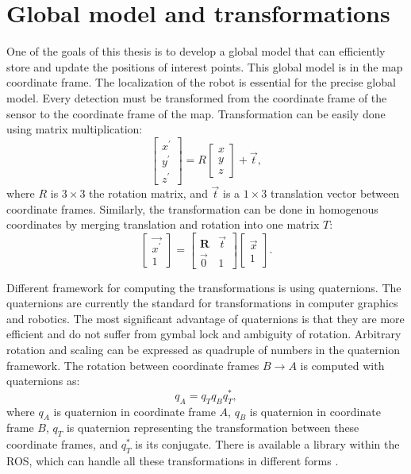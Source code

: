 \section{Global model and transformations}
One of the goals of this thesis is to develop a global model that can efficiently store and update the positions of interest points. This global model is in the map coordinate frame. The localization of the robot is essential for the precise global model. Every detection must be transformed from the coordinate frame of the sensor to the coordinate frame of the map. Transformation can be easily done using matrix multiplication:
\begin{equation}
\begin{bmatrix}
x^\prime \\
y^\prime \\
z^\prime 
\end{bmatrix}
=
R \begin{bmatrix}
x \\
y \\
z
\end{bmatrix}
+ \vec{t},
\end{equation}
where $R$ is $3\times3$ the rotation matrix, and $\vec{t}$ is a $1\times3$ translation vector between coordinate frames. Similarly, the transformation can be done in homogenous coordinates by merging translation and rotation into one matrix $T$:
\begin{equation}
\begin{bmatrix}
\vec{x^\prime} \\
1
\end{bmatrix}
=
\begin{bmatrix}
 \bm{R} & \vec{t} \\
 \vec{0} &  1
\end{bmatrix}
\begin{bmatrix}
\vec{x}\\
1
\end{bmatrix}.
\end{equation}

Different framework for computing the transformations is using quaternions. The quaternions are currently the standard for transformations in computer graphics and robotics. The most significant advantage of quaternions is that they are more efficient and do not suffer from gymbal lock and ambiguity of rotation. Arbitrary rotation and scaling can be expressed as quadruple of numbers in the quaternion framework. The rotation between coordinate frames $B \to A$ is computed with quaternions as:
\begin{equation}
q_A = q_T q_B q_T^*,
\end{equation}
where $q_A$ is quaternion in coordinate frame $A$, $q_B$ is quaternion in coordinate frame $B$, $q_T$ is quaternion representing the transformation between these coordinate frames, and $q_T^*$ is its conjugate. There is available a library within the ROS, which can handle all these transformations in different forms \cite{tf}. 

